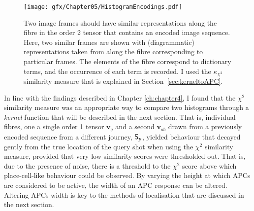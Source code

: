 \begin{figure}
\centering
\texttt{[image: gfx/Chapter05/HistogramEncodings.pdf]}
\caption{Two image frames should have similar representations along the fibre in the order 2 tensor that contains an encoded image sequence.  Here, two similar frames are shown with (diagrammatic) representations taken from along the fibre corresponding to particular frames.  The elements of the fibre correspond to dictionary terms, and the occurrence of each term is recorded.  I used the $\kappa_{\chi^2}$ similarity measure that is explained in Section~\ref{sec:kerneltoAPC}.}
\label{fig:HistEncodings}
\end{figure}


In line with the findings described in Chapter \ref{ch:chapter4}, I found that the $\chi^2$ similarity measure was an appropriate way to compare two histograms through a \textit{kernel} function that will be described in the next section. That is, individual fibres, one a single order 1 tensor $\mathbf{v}_q$ and a second $\mathbf{v}_{db}$ drawn from a previously encoded sequence from a different journey, $\mathsf{S}_p$, yielded behaviour that decayed gently from the true location of the query shot when using the $\chi^2$ similarity measure, provided that very low similarity scores were thresholded out.  That is, due to the presence of noise, there is a threshold to the $\chi^2$ score above which place-cell-like behaviour could be observed.  By varying the height at which APCs are considered to be active, the width of an APC response can be altered.  Altering APCs width is key to the methods of localisation that are discussed in the next section.  


